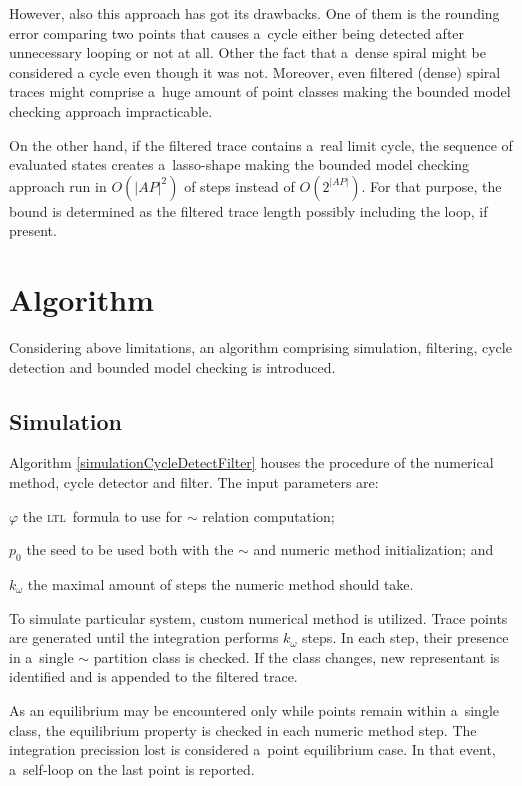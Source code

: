 \documentclass[12pt,twoside,draft]{fithesis}
\newcommand{\ltl}{\textsc{ltl}~}
\begin{document}
However, also this approach has got its drawbacks. One of them
is the rounding error comparing two points that causes a~cycle either
being detected after unnecessary looping or not at all. Other the fact
that a~dense spiral might be considered a cycle even though it was not.
Moreover, even filtered (dense) spiral traces might comprise a~huge
amount of point classes making the bounded model checking approach
impracticable.

On the other hand, if the filtered trace contains a~real limit cycle,
the sequence of evaluated states creates a~lasso-shape making the
bounded model checking approach run in $O(|AP|^2)$ of steps
instead of $O(2^{|AP|})$\cite{biere}. For that purpose, the bound is
determined as the filtered trace length possibly including the loop, if
present.

\section{Algorithm}
Considering above limitations, an algorithm comprising simulation,
filtering, cycle detection and bounded model checking is introduced.
\subsection*{Simulation}
Algorithm \ref{simulationCycleDetectFilter} houses the procedure of
the numerical method, cycle detector and filter. The input parameters are:
\begin{inparaenum}
	\item{$\varphi$} the \ltl formula to use for $\sim$ relation
		computation;
	\item{$p_0$} the seed to be used both with the $\sim$ and numeric
		method initialization; and
	\item{$k_{\omega}$} the maximal amount of steps the numeric method
		should take.
\end{inparaenum}

To simulate particular system, custom numerical method is utilized.
Trace points are generated until the integration performs $k_{\omega}$
steps. In each step, their presence in a~single $\sim$ partition class
is checked. If the class changes, new representant is identified
and is appended to the filtered trace.

As an equilibrium may be encountered only while points remain within
a~single class, the equilibrium property is checked in each numeric
method step. The integration precission lost is considered a~point
equilibrium case. In that event, a~self-loop on the last point is
reported.
\end{document}
